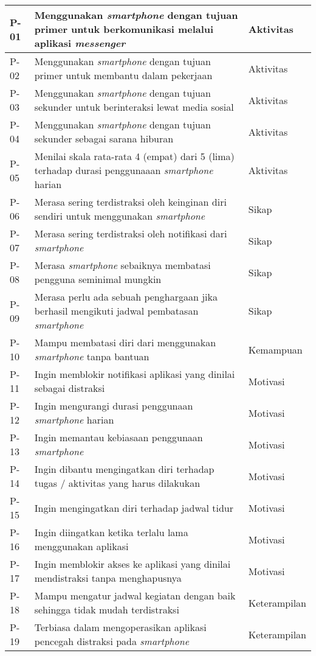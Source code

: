 \begin{small}
\begin{longtable}[c]{|W{c}{0.06\textwidth}|>{\ccnormspacing}m{0.66\textwidth}|>{\ccnormspacingcenter}m{0.175\textwidth}|}
  P-01  &  Menggunakan \textit{smartphone} dengan tujuan primer untuk berkomunikasi melalui aplikasi \textit{messenger}  & Aktivitas \\ \hline
  P-02  &  Menggunakan \textit{smartphone} dengan tujuan primer untuk membantu dalam pekerjaan & Aktivitas \\ \hline
  P-03  &  Menggunakan \textit{smartphone} dengan tujuan sekunder untuk berinteraksi lewat media sosial & Aktivitas \\ \hline
  P-04  &  Menggunakan \textit{smartphone} dengan tujuan sekunder sebagai sarana hiburan & Aktivitas \\ \hline
  P-05  &  Menilai skala rata-rata 4 (empat) dari 5 (lima) terhadap durasi penggunaaan \textit{smartphone} harian & Aktivitas \\ \hline
  P-06  &  Merasa sering terdistraksi oleh keinginan diri sendiri untuk menggunakan \textit{smartphone}  & Sikap \\ \hline
  P-07  &  Merasa sering terdistraksi oleh notifikasi dari \textit{smartphone} & Sikap \\ \hline
  P-08  &  Merasa \textit{smartphone} sebaiknya membatasi pengguna seminimal mungkin & Sikap \\ \hline
  P-09  &  Merasa perlu ada sebuah penghargaan jika berhasil mengikuti jadwal pembatasan \textit{smartphone} & Sikap \\ \hline
  P-10  &  Mampu membatasi diri dari menggunakan \textit{smartphone} tanpa bantuan & Kemampuan \\ \hline
  P-11  &  Ingin memblokir notifikasi aplikasi yang dinilai sebagai distraksi & Motivasi \\ \hline
  P-12  &  Ingin mengurangi durasi penggunaan \textit{smartphone} harian & Motivasi \\ \hline
  P-13  &  Ingin memantau kebiasaan penggunaan \textit{smartphone} & Motivasi \\ \hline
  P-14  &  Ingin dibantu mengingatkan diri terhadap tugas / aktivitas yang harus dilakukan & Motivasi \\ \hline
  P-15  &  Ingin mengingatkan diri terhadap jadwal tidur & Motivasi \\ \hline
  P-16  &  Ingin diingatkan ketika terlalu lama menggunakan aplikasi & Motivasi \\ \hline
  P-17  &  Ingin memblokir akses ke aplikasi yang dinilai mendistraksi tanpa menghapusnya & Motivasi \\ \hline
  P-18  &  Mampu mengatur jadwal kegiatan dengan baik sehingga tidak mudah terdistraksi & Keterampilan \\ \hline
  P-19  &  Terbiasa dalam mengoperasikan aplikasi pencegah distraksi pada \textit{smartphone}  & Keterampilan \\ \hline
\end{longtable}
\end{small}
\justifying
\FloatBarrier

